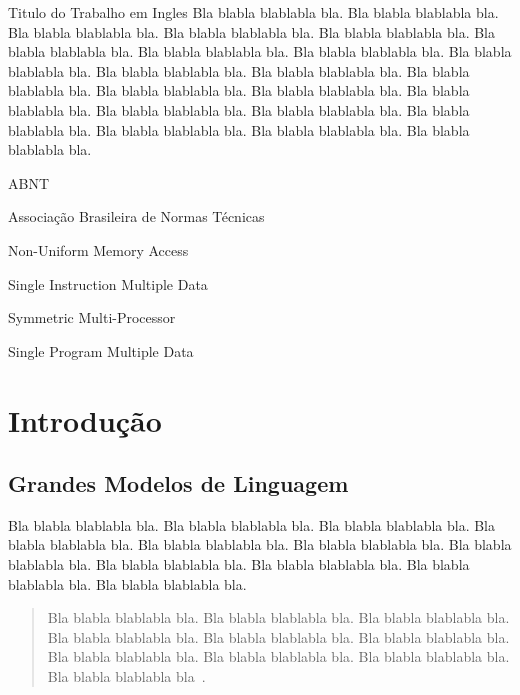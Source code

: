 \documentclass[tcc,capa]{texufpel}
\begin{document}
\begin{englishabstract}{Titulo do Trabalho em Ingles}
Bla blabla blablabla bla.  Bla blabla blablabla bla.  Bla blabla
blablabla bla.  Bla blabla blablabla bla.  Bla blabla blablabla bla.
Bla blabla blablabla bla.  Bla blabla blablabla bla.  Bla blabla
blablabla bla.  Bla blabla blablabla bla.  Bla blabla blablabla bla.
Bla blabla blablabla bla.  Bla blabla blablabla bla.  Bla blabla
blablabla bla.  Bla blabla blablabla bla.  Bla blabla blablabla bla.
Bla blabla blablabla bla.  Bla blabla blablabla bla.  Bla blabla
blablabla bla.  Bla blabla blablabla bla.  Bla blabla blablabla bla.
Bla blabla blablabla bla.
\end{englishabstract}

\listoffigures

\listoftables

\begin{listofabbrv}{ABNT}%
        \item[ABNT] Associação Brasileira de Normas Técnicas
        \item[NUMA] Non-Uniform Memory Access
        \item[SIMD] Single Instruction Multiple Data
        \item[SMP] Symmetric Multi-Processor
        \item[SPMD] Single Program Multiple Data
\end{listofabbrv}

\tableofcontents

\chapter{Introdução}

\section{Grandes Modelos de Linguagem}

Bla blabla blablabla bla.  Bla blabla blablabla bla.  Bla blabla
blablabla bla.  Bla blabla blablabla bla.  Bla blabla blablabla bla.
Bla blabla blablabla bla.  Bla blabla blablabla bla.  Bla blabla
blablabla bla.  Bla blabla blablabla bla.  Bla blabla blablabla bla.
Bla blabla blablabla bla.

\begin{quote}
  Bla blabla blablabla bla.  Bla blabla blablabla bla.  Bla blabla
  blablabla bla.  Bla blabla blablabla bla.  Bla blabla blablabla bla.
  Bla blabla blablabla bla.  Bla blabla blablabla bla.  Bla blabla
  blablabla bla.  Bla blabla blablabla bla.  Bla blabla blablabla
  bla~\citet{Moore:1979:MAI,Aguiar:2005}.
\end{quote}
  
\end{document}
